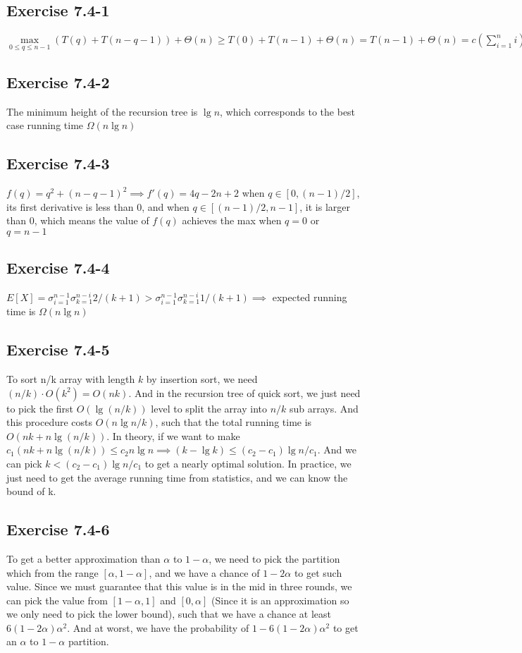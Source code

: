 \documentclass[12pt]{article}
\theoremstyle{definition}
\theoremstyle{remark}
\begin{document}
\subsection*{Exercise 7.4-1}
$\max\limits_{0\le q\le n-1}(T(q)+T(n-q-1))+\Theta(n)\ge T(0)+T(n-1)+\Theta(n)=T(n-1)+\Theta(n)=c(\sum_{i=1}^ni)=\Omega(n^2)$
\subsection*{Exercise 7.4-2}
The minimum height of the recursion tree is $\lg{n}$, which corresponds to the best case running time $\Omega(n\lg n)$
\subsection*{Exercise 7.4-3}
$f(q)=q^2+(n-q-1)^2\implies f'(q)=4q-2n+2$ when $q\in[0,(n-1)/2]$, its first derivative is less than 0, and when $q\in[(n-1)/2,n-1]$, it is larger than 0, which means the value of $f(q)$ achieves the max when $q=0$ or $q=n-1$
\subsection*{Exercise 7.4-4}
$E[X]=\sigma_{i=1}^{n-1}\sigma_{k=1}^{n-i}2/(k+1)>\sigma_{i=1}^{n-1}\sigma_{k=1}^{n-i}1/(k+1)\implies$ expected running time is $\Omega(n\lg n)$
\subsection*{Exercise 7.4-5}
To sort n/k array with length $k$ by insertion sort, we need $(n/k)\cdot O(k^2)=O(nk)$. And in the recursion tree of quick sort, we just need to pick the first $O(\lg(n/k))$ level to split the array into $n/k$ sub arrays. And this procedure costs $O(n\lg{n/k})$, such that the total running time is $O(nk+n\lg(n/k))$. In theory, if we want to make $c_1(nk+n\lg(n/k))\le c_2n\lg n\implies (k-\lg k)\le (c_2-c_1)\lg n/c_1$. And we can pick $k< (c_2-c_1)\lg n/c_1$ to get a nearly optimal solution. In practice, we just need to get the average running time from statistics, and we can know the bound of k.
\subsection*{Exercise 7.4-6}
To get a better approximation than $\alpha$ to $1-\alpha$, we need to pick the partition which from the range $[\alpha, 1-\alpha]$, and we have a chance of $1-2\alpha$ to get such value. Since we must guarantee that this value is in the mid in three rounds, we can pick the value from $[1-\alpha,1]$ and $[0,\alpha]$ (Since it is an approximation so we only need to pick the lower bound), such that we have a chance at least $6(1-2\alpha)\alpha^2$. And at worst, we have the probability of $1-6(1-2\alpha)\alpha^2$ to get an $\alpha$ to $1-\alpha$ partition.
\end{document}
